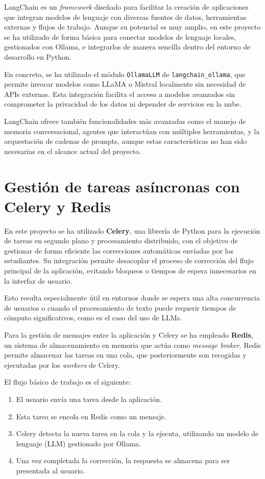 LangChain es un \textit{framework} diseñado para facilitar la creación de aplicaciones 
que integran modelos de lenguaje con diversas fuentes de datos, herramientas externas 
y flujos de trabajo. Aunque su potencial es muy amplio, en este proyecto se ha 
utilizado de forma básica para conectar modelos de lenguaje locales, 
gestionados con Ollama, e integrarlos de manera sencilla dentro del entorno de desarrollo 
en Python.

En concreto, se ha utilizado el módulo \texttt{OllamaLLM} de \texttt{langchain\_ollama}, 
que permite invocar modelos como LLaMA o Mistral localmente sin necesidad de APIs externas. 
Esta integración facilita el acceso a modelos avanzados sin comprometer la privacidad de 
los datos ni depender de servicios en la nube.

LangChain ofrece también funcionalidades más avanzadas como el manejo de memoria conversacional, 
agentes que interactúan con múltiples herramientas, y la orquestación de cadenas de prompts, 
aunque estas características no han sido necesarias en el alcance actual del proyecto.

\section{Gestión de tareas asíncronas con Celery y Redis}

En este proyecto se ha utilizado \textbf{Celery}, una librería de Python para la ejecución de
tareas en segundo plano y procesamiento distribuido, con el objetivo de gestionar de forma 
eficiente las correcciones automáticas enviadas por los estudiantes. Su integración 
permite desacoplar el proceso de corrección del flujo principal de la aplicación, 
evitando bloqueos o tiempos de espera innecesarios en la interfaz de usuario.

Esto resulta especialmente útil en entornos donde se espera una
alta concurrencia de usuarios o cuando el procesamiento de texto puede requerir 
tiempos de cómputo significativos, como es el caso del uso de LLMs.

Para la gestión de mensajes entre la aplicación y Celery se ha empleado \textbf{Redis}, 
un sistema de almacenamiento en memoria que actúa como \textit{message broker}. Redis 
permite almacenar las tareas en una cola, que posteriormente son recogidas y ejecutadas 
por los \textit{workers} de Celery.

El flujo básico de trabajo es el siguiente:
\begin{enumerate}
    \item El usuario envía una tarea desde la aplicación.
    \item Esta tarea se encola en Redis como un mensaje.
    \item Celery detecta la nueva tarea en la cola y la ejecuta, utilizando un modelo de lenguaje (LLM) gestionado por Ollama.
    \item Una vez completada la corrección, la respuesta se almacena para ser presentada al usuario.
\end{enumerate}


